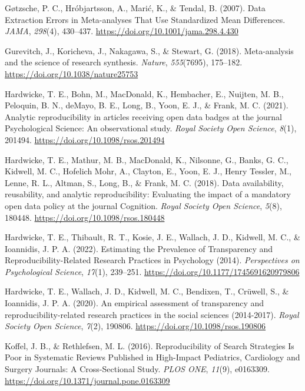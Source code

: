 \documentclass[
  ,apa7,floatsintext]{apa6}
\newlength{\cslhangindent}
\newlength{\cslentryspacingunit} %
\newenvironment{CSLReferences}[2] %
 {%
  \setlength{\parindent}{0pt}
  \ifodd #1
  \let\oldpar\par
  \def\par{\hangindent=\cslhangindent\oldpar}
  \fi
  \setlength{\parskip}{#2\cslentryspacingunit}
 }%
 {}
\begin{document}
\begin{CSLReferences}{1}{0}
\leavevmode{}%
Gøtzsche, P. C., Hróbjartsson, A., Marić, K., \& Tendal, B. (2007). Data {Extraction Errors} in {Meta-analyses That Use Standardized Mean Differences}. \emph{JAMA}, \emph{298}(4), 430--437. \url{https://doi.org/10.1001/jama.298.4.430}

\leavevmode{}%
Gurevitch, J., Koricheva, J., Nakagawa, S., \& Stewart, G. (2018). Meta-analysis and the science of research synthesis. \emph{Nature}, \emph{555}(7695), 175--182. \url{https://doi.org/10.1038/nature25753}

\leavevmode{}%
Hardwicke, T. E., Bohn, M., MacDonald, K., Hembacher, E., Nuijten, M. B., Peloquin, B. N., deMayo, B. E., Long, B., Yoon, E. J., \& Frank, M. C. (2021). Analytic reproducibility in articles receiving open data badges at the journal {Psychological Science}: An observational study. \emph{Royal Society Open Science}, \emph{8}(1), 201494. \url{https://doi.org/10.1098/rsos.201494}

\leavevmode{}%
Hardwicke, T. E., Mathur, M. B., MacDonald, K., Nilsonne, G., Banks, G. C., Kidwell, M. C., Hofelich Mohr, A., Clayton, E., Yoon, E. J., Henry Tessler, M., Lenne, R. L., Altman, S., Long, B., \& Frank, M. C. (2018). Data availability, reusability, and analytic reproducibility: Evaluating the impact of a mandatory open data policy at the journal {Cognition}. \emph{Royal Society Open Science}, \emph{5}(8), 180448. \url{https://doi.org/10.1098/rsos.180448}

\leavevmode{}%
Hardwicke, T. E., Thibault, R. T., Kosie, J. E., Wallach, J. D., Kidwell, M. C., \& Ioannidis, J. P. A. (2022). Estimating the {Prevalence} of {Transparency} and {Reproducibility-Related Research Practices} in {Psychology} (2014). \emph{Perspectives on Psychological Science}, \emph{17}(1), 239--251. \url{https://doi.org/10.1177/1745691620979806}

\leavevmode{}%
Hardwicke, T. E., Wallach, J. D., Kidwell, M. C., Bendixen, T., Crüwell, S., \& Ioannidis, J. P. A. (2020). An empirical assessment of transparency and reproducibility-related research practices in the social sciences (2014-2017). \emph{Royal Society Open Science}, \emph{7}(2), 190806. \url{https://doi.org/10.1098/rsos.190806}

\leavevmode{}%
Koffel, J. B., \& Rethlefsen, M. L. (2016). Reproducibility of {Search} {Strategies} {Is} {Poor} in {Systematic} {Reviews} {Published} in {High}-{Impact} {Pediatrics}, {Cardiology} and {Surgery} {Journals}: {A} {Cross}-{Sectional} {Study}. \emph{PLOS ONE}, \emph{11}(9), e0163309. \url{https://doi.org/10.1371/journal.pone.0163309}


\end{CSLReferences}
\end{document}
